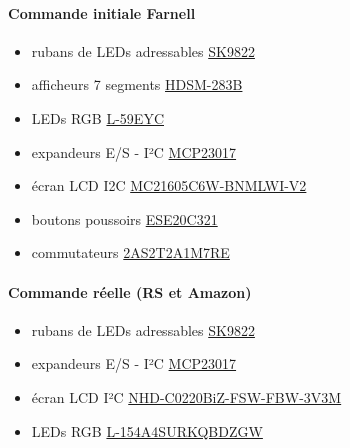 \documentclass[12pt]{report}
\begin{document}
	\paragraph{Commande initiale Farnell}
	\begin{itemize}[label=$-$]
		\item rubans de LEDs adressables \href{https://fr.aliexpress.com/item/1005006918408592.html?spm=a2g0o.productlist.main.19.fbb0788296kxRo&algo_pvid=72d2c9a9-ec47-4e4b-9d14-7e90be35485c&algo_exp_id=72d2c9a9-ec47-4e4b-9d14-7e90be35485c-9&pdp_npi=4%40dis!EUR!18.92!18.92!!!145.68!145.68!%402103888a17169934968957029e0b2f!12000038723750387!sea!FR!0!AB&curPageLogUid=lAauznpLAY1Y&utparam-url=scene%3Asearch%7Cquery_from%3A}{SK9822}
		\item afficheurs 7 segments \href{https://fr.farnell.com/broadcom-limited/hdsm-283b/afficheur-a-led-cms-7mm-bleu-cc/dp/1659312}{HDSM-283B}
		\item LEDs RGB \href{https://fr.farnell.com/kingbright/l-59eyc/led-5mm-tricolore/dp/1168662}{L-59EYC}
		\item expandeurs E/S - I²C \href{https://fr.farnell.com/microchip/mcp23017-e-sp/16-bit-expander-i-o-i2c-i-f/dp/1332088}{MCP23017}
		\item écran LCD I2C \href{https://fr.farnell.com/midas/mc21605c6w-bnmlwi-v2/afficheur-alphanumerique-16x2/dp/2748649}{MC21605C6W-BNMLWI-V2}
		\item boutons poussoirs \href{https://fr.farnell.com/panasonic/ese20c321/commutateur-bouton-pouss-momentane/dp/2079613}{ESE20C321}
		\item commutateurs \href{https://fr.farnell.com/multicomp/2as2t2a1m7re/switch-toggle-spdt-on-mom/dp/1550118}{2AS2T2A1M7RE}
	\end{itemize}
	\paragraph{Commande réelle (RS et Amazon)}
	\begin{itemize}[label=$-$]
		\item rubans de LEDs adressables \href{https://fr.aliexpress.com/item/1005006918408592.html?spm=a2g0o.productlist.main.19.fbb0788296kxRo&algo_pvid=72d2c9a9-ec47-4e4b-9d14-7e90be35485c&algo_exp_id=72d2c9a9-ec47-4e4b-9d14-7e90be35485c-9&pdp_npi=4%40dis!EUR!18.92!18.92!!!145.68!145.68!%402103888a17169934968957029e0b2f!12000038723750387!sea!FR!0!AB&curPageLogUid=lAauznpLAY1Y&utparam-url=scene%3Asearch%7Cquery_from%3A}{SK9822}
		\item expandeurs E/S - I²C \href{https://fr.farnell.com/microchip/mcp23017-e-sp/16-bit-expander-i-o-i2c-i-f/dp/1332088}{MCP23017}
		\item écran LCD I²C \href{https://fr.rs-online.com/web/p/afficheurs-monochromes-lcd/2644045?searchId=b08a66da-698d-420f-a525-b4944d7ccd96&gb=s}{NHD-C0220BiZ-FSW-FBW-3V3M}\\
		\item LEDs RGB \href{https://fr.rs-online.com/web/p/leds/1651767?gb=s}{L-154A4SURKQBDZGW}
	\end{itemize}
\end{document}
